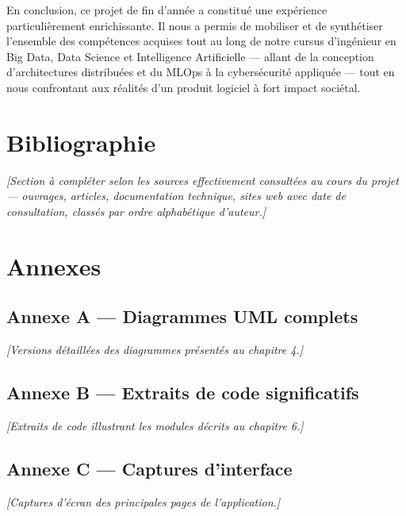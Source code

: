 \documentclass[12pt,a4paper]{report}
\begin{document}
\vspace{0.5cm}
En conclusion, ce projet de fin d'année a constitué une expérience particulièrement enrichissante. Il nous a permis de mobiliser et de synthétiser l'ensemble des compétences acquises tout au long de notre cursus d'ingénieur en Big Data, Data Science et Intelligence Artificielle — allant de la conception d'architectures distribuées et du MLOps à la cybersécurité appliquée — tout en nous confrontant aux réalités d'un produit logiciel à fort impact sociétal.

\newpage

\chapter*{Bibliographie}
\textit{[Section à compléter selon les sources effectivement consultées au cours du projet — ouvrages, articles, documentation technique, sites web avec date de consultation, classés par ordre alphabétique d'auteur.]}

\newpage

\chapter*{Annexes}
\section*{Annexe A — Diagrammes UML complets}
\textit{[Versions détaillées des diagrammes présentés au chapitre 4.]}

\section*{Annexe B — Extraits de code significatifs}
\textit{[Extraits de code illustrant les modules décrits au chapitre 6.]}

\section*{Annexe C — Captures d'interface}
\textit{[Captures d'écran des principales pages de l'application.]}
\end{document}
